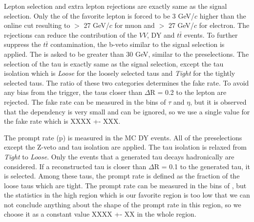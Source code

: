 Lepton selection and extra lepton rejections are exactly same as the signal selection. Only the \pT of the favorite lepton is forced to 
be 3 GeV/$c$ higher than the online cut resulting to \pT $>$ 27 GeV/$c$ for muon and \pT $>$ 27 GeV/$c$ for electron.
The rejections can reduce the contribution of the $VV$, DY and $t\bar{t}$ events. To further suppress the $t\bar{t}$ contamination, the b-veto 
similar to the signal selection is applied. The \met is asked to be greater than 30 GeV, similar to the preselections. The selection of the tau is 
exactly same as the signal selection, except the tau isolation which is {\it Loose} for the loosely selected taus and {\it Tight} for the 
tightly selected taus.
The ratio of these two categories determines the fake rate. To avoid any bias from the trigger, the taus closer than $\Delta$R = 0.2 to the 
lepton are rejected. 
The fake rate can be measured in the bins of $\tau$ \pT and $\eta$, but it is observed that the dependency is very small and can be ignored, 
so we use a single value for the fake rate which is XXXX +- XXX.

The prompt rate (p) is measured in the MC DY events. All of the preselections except the Z-veto and tau isolation are applied. The tau isolation 
is relaxed from {\it Tight} to {\it Loose}. Only the events that a generated tau decays hadronically are considered. If a reconstructed tau is 
closer than $\Delta$R = 0.1 to the generated tau, it is selected. Among these taus, the prompt rate is defined as the fraction of the loose taus 
which are tight. The prompt rate can be measured in the bins of \mttwo, but the statistics in the high \mttwo region which is our favorite 
region is too low that we can not conclude anything about the shape of the prompt rate in this region, so we choose it as a constant value
XXXX +- XX in the whole \mttwo region.



